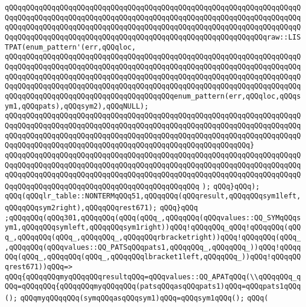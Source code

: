 \verb|qQQqqQQqqQQqqQQqqQQqqQQqqQQqqQQqqQQqqQQqqQQqqQQqqQQqqQQqqQQqqQQqqQQqqQQqqQQqqQQqqQQqqQQqqQQqqQQqqQQqqQQqqQQqqQQqqQQqqQQqqQQqqQQqqQQqqQQqqQQqqQQqqQQqqQQqqQQqqQQqqQQqqQQqqQQqqQQqqQQqqQQqqQQqqQQqqQQqqQQqqQQqqQQqqQQqqQQqqQQqqQQqqQQqqQQqqQQqqQQqqQQqqQQqqQQqqQQqqQQqqQQqqQQqqQQqraw::LISTPAT(enum_pattern'(err,qQQqloc,|\newline
\verb|qQQqqQQqqQQqqQQqqQQqqQQqqQQqqQQqqQQqqQQqqQQqqQQqqQQqqQQqqQQqqQQqqQQqqQQqqQQqqQQqqQQqqQQqqQQqqQQqqQQqqQQqqQQqqQQqqQQqqQQqqQQqqQQqqQQqqQQqqQQqqQQqqQQqqQQqqQQqqQQqqQQqqQQqqQQqqQQqqQQqqQQqqQQqqQQqqQQqqQQqqQQqqQQqqQQqqQQqqQQqqQQqqQQqqQQqqQQqqQQqqQQqqQQqqQQqqQQqqQQqqQQqqQQqqQQqqQQqqQQqqQQqqQQqqQQqqQQqqQQqqQQqqQQqqQQqqQQqqQQqenum_pattern(err,qQQqloc,qQQqsym1,qQQqpats),qQQqsym2),qQQqNULL);|\newline
\verb|qQQqqQQqqQQqqQQqqQQqqQQqqQQqqQQqqQQqqQQqqQQqqQQqqQQqqQQqqQQqqQQqqQQqqQQqqQQqqQQqqQQqqQQqqQQqqQQqqQQqqQQqqQQqqQQqqQQqqQQqqQQqqQQqqQQqqQQqqQQqqQQqqQQqqQQqqQQqqQQqqQQqqQQqqQQqqQQqqQQqqQQqqQQqqQQqqQQqqQQqqQQqqQQqqQQqqQQqqQQqqQQqqQQqqQQqqQQqqQQqqQQqqQQqqQQqqQQqqQQqqQQqqQQq}|\newline
\verb|qQQqqQQqqQQqqQQqqQQqqQQqqQQqqQQqqQQqqQQqqQQqqQQqqQQqqQQqqQQqqQQqqQQqqQQqqQQqqQQqqQQqqQQqqQQqqQQqqQQqqQQqqQQqqQQqqQQqqQQqqQQqqQQqqQQqqQQqqQQqqQQqqQQqqQQqqQQqqQQqqQQqqQQqqQQqqQQqqQQqqQQqqQQqqQQqqQQqqQQqqQQqqQQqqQQqqQQqqQQqqQQqqQQqqQQqqQQqqQQqqQQqqQQqqQQqqQQq|\newline
\verb|);|\newline
\verb|qQQq}qQQq);|\newline
\verb|qQQq(qQQqlr_table::NONTERMqQQq51,qQQqqQQq(qQQqresult,qQQqqQQqsym1left,qQQqqQQqsym2right),qQQqqQQqrest671);|\newline
\verb|qQQq}qQQq|\newline
\verb|;qQQqqQQq(qQQq301,qQQqqQQq(qQQq(qQQq_,qQQqqQQq(qQQqvalues::QQ_SYMqQQqsym1,qQQqqQQqsymleft,qQQqqQQqsym1right))qQQq!qQQqqQQq_qQQq!qQQqqQQq(qQQq_,qQQqqQQq(qQQq_,qQQqqQQq_,qQQqqQQqrbracketright))qQQq!qQQqqQQq(qQQq_,qQQqqQQq(qQQqvalues::QQ_PATSqQQqpats1,qQQqqQQq_,qQQqqQQq_))qQQq!qQQqqQQq(qQQq_,qQQqqQQq(qQQq_,qQQqqQQqlbracket1left,qQQqqQQq_))qQQq!qQQqqQQqrest671))qQQq=>|\newline
\verb|qQQq{qQQqqQQqmyqQQqqQQqresultqQQq=qQQqvalues::QQ_APATqQQq(\\qQQqqQQq_qQQq=qQQqqQQq{qQQqqQQqmyqQQqqQQq(patsqQQqasqQQqpats1)qQQq=qQQqpats1qQQq();|\newline
\verb|qQQqmyqQQqqQQq(symqQQqasqQQqsym1)qQQq=qQQqsym1qQQq();|\newline
\verb|qQQq(|\newline
